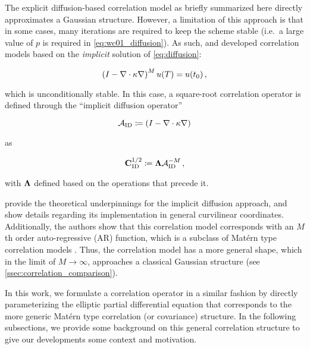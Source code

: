 The explicit diffusion-based correlation model as briefly summarized here
directly approximates a Gaussian structure.
However, a limitation of this approach is that in some cases, many
iterations are required to keep the scheme stable (i.e.\ a large value of $p$ is
required in \cref{eq:wc01_diffusion}).
As such, \citet{mirouze_representation_2010} and
\citet{carrier_background-error_2010} developed correlation models based on the
\textit{implicit} solution of \cref{eq:diffusion}:
\begin{linenomath*}\begin{equation}
    \left( I - \nabla\cdot\kappa\nabla\right)^Mu(T) = u(t_0) \, ,
    \label{eq:implicit_diffusion}
\end{equation}\end{linenomath*}
which is unconditionally stable.
In this case, a square-root correlation operator is defined through the
``implicit diffusion operator''
\begin{linenomath*}\begin{equation}
    \mathcal{A}_\text{ID} \coloneqq \left(I - \nabla \cdot \kappa\nabla\right)
\end{equation}\end{linenomath*}
as
\begin{linenomath*}\begin{equation}
    \mathbf{C}^{1/2}_\text{ID} \coloneqq \mathbf{\Lambda} \mathcal{A}_\text{ID}^{-M} \, ,
\end{equation}\end{linenomath*}
with $\mathbf{\Lambda}$ defined based on the operations that precede it.

\citet{mirouze_representation_2010} provide the theoretical underpinnings for
the implicit diffusion approach, and show details regarding its implementation
in general curvilinear coordinates.
Additionally, the authors show that this correlation model corresponds
with an $M$th order auto-regressive (AR) function,
which is a subclass of
Mat\'ern type correlation models \citep[see][for more description of the
parameters controlling this model]{weaver_diffusion_2013}.
Thus, the correlation model has a more general shape, which in the limit of
$M\rightarrow\infty$, approaches a classical Gaussian structure (see
\cref{ssec:correlation_comparison}).

In this work, we formulate a correlation operator in a similar fashion by
directly parameterizing the
elliptic partial differential equation that corresponds to the more generic
Mat\'ern type correlation (or covariance) structure.
In the following subsections, we provide some background on this general correlation
structure to give our developments some context and motivation.

